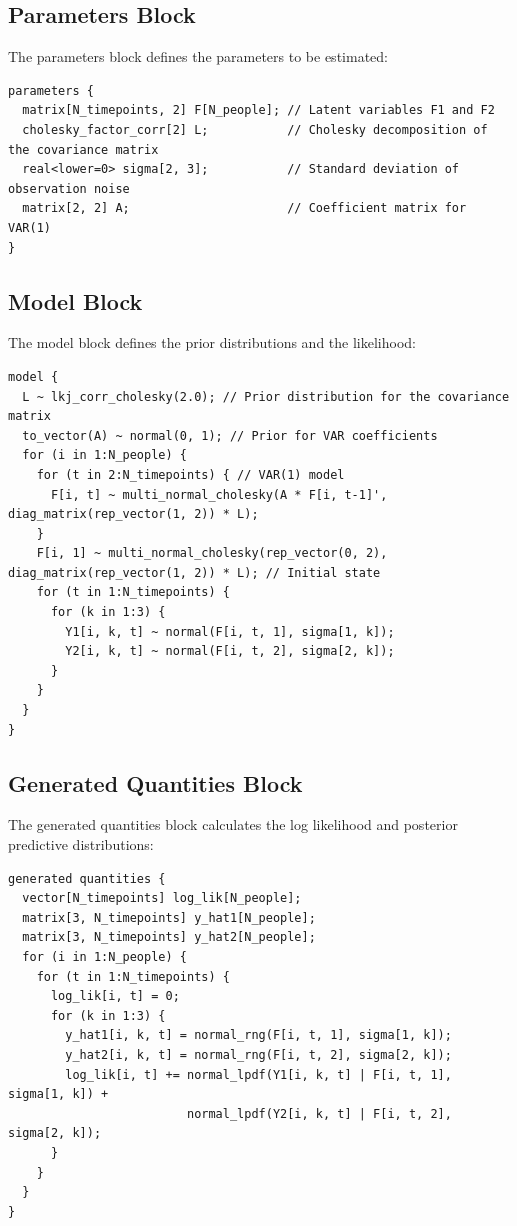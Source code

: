 \documentclass{article}
\begin{document}
\subsection{Parameters Block}
The parameters block defines the parameters to be estimated:
\begin{verbatim}
parameters {
  matrix[N_timepoints, 2] F[N_people]; // Latent variables F1 and F2
  cholesky_factor_corr[2] L;           // Cholesky decomposition of the covariance matrix
  real<lower=0> sigma[2, 3];           // Standard deviation of observation noise
  matrix[2, 2] A;                      // Coefficient matrix for VAR(1)
}
\end{verbatim}

\subsection{Model Block}
The model block defines the prior distributions and the likelihood:
\begin{verbatim}
model {
  L ~ lkj_corr_cholesky(2.0); // Prior distribution for the covariance matrix
  to_vector(A) ~ normal(0, 1); // Prior for VAR coefficients
  for (i in 1:N_people) {
    for (t in 2:N_timepoints) { // VAR(1) model
      F[i, t] ~ multi_normal_cholesky(A * F[i, t-1]', diag_matrix(rep_vector(1, 2)) * L);
    }
    F[i, 1] ~ multi_normal_cholesky(rep_vector(0, 2), diag_matrix(rep_vector(1, 2)) * L); // Initial state
    for (t in 1:N_timepoints) {
      for (k in 1:3) {
        Y1[i, k, t] ~ normal(F[i, t, 1], sigma[1, k]);
        Y2[i, k, t] ~ normal(F[i, t, 2], sigma[2, k]);
      }
    }
  }
}
\end{verbatim}

\subsection{Generated Quantities Block}
The generated quantities block calculates the log likelihood and posterior predictive distributions:
\begin{verbatim}
generated quantities {
  vector[N_timepoints] log_lik[N_people];
  matrix[3, N_timepoints] y_hat1[N_people];
  matrix[3, N_timepoints] y_hat2[N_people];
  for (i in 1:N_people) {
    for (t in 1:N_timepoints) {
      log_lik[i, t] = 0;
      for (k in 1:3) {
        y_hat1[i, k, t] = normal_rng(F[i, t, 1], sigma[1, k]);
        y_hat2[i, k, t] = normal_rng(F[i, t, 2], sigma[2, k]);
        log_lik[i, t] += normal_lpdf(Y1[i, k, t] | F[i, t, 1], sigma[1, k]) +
                         normal_lpdf(Y2[i, k, t] | F[i, t, 2], sigma[2, k]);
      }
    }
  }
}
\end{verbatim}
\end{document}
